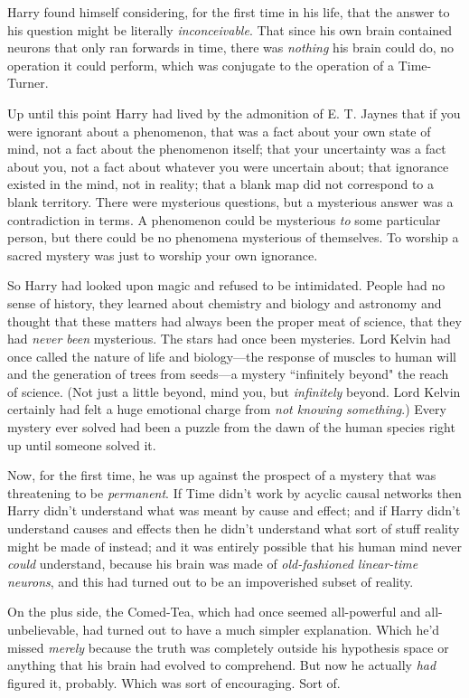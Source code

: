 Harry found himself considering, for the first time in his life, that the answer to his question might be literally \emph{inconceivable}. That since his own brain contained neurons that only ran forwards in time, there was \emph{nothing} his brain could do, no operation it could perform, which was conjugate to the operation of a Time-Turner.

Up until this point Harry had lived by the admonition of E. T. Jaynes that if you were ignorant about a phenomenon, that was a fact about your own state of mind, not a fact about the phenomenon itself; that your uncertainty was a fact about you, not a fact about whatever you were uncertain about; that ignorance existed in the mind, not in reality; that a blank map did not correspond to a blank territory. There were mysterious questions, but a mysterious answer was a contradiction in terms. A phenomenon could be mysterious \emph{to} some particular person, but there could be no phenomena mysterious of themselves. To worship a sacred mystery was just to worship your own ignorance.

So Harry had looked upon magic and refused to be intimidated. People had no sense of history, they learned about chemistry and biology and astronomy and thought that these matters had always been the proper meat of science, that they had \emph{never been} mysterious. The stars had once been mysteries. Lord Kelvin had once called the nature of life and biology—the response of muscles to human will and the generation of trees from seeds—a mystery ``infinitely beyond" the reach of science. (Not just a little beyond, mind you, but \emph{infinitely} beyond. Lord Kelvin certainly had felt a huge emotional charge from \emph{not knowing something}.) Every mystery ever solved had been a puzzle from the dawn of the human species right up until someone solved it.

Now, for the first time, he was up against the prospect of a mystery that was threatening to be \emph{permanent}. If Time didn't work by acyclic causal networks then Harry didn't understand what was meant by cause and effect; and if Harry didn't understand causes and effects then he didn't understand what sort of stuff reality might be made of instead; and it was entirely possible that his human mind never \emph{could} understand, because his brain was made of \emph{old-fashioned linear-time neurons}, and this had turned out to be an impoverished subset of reality.

On the plus side, the Comed-Tea, which had once seemed all-powerful and all-unbelievable, had turned out to have a much simpler explanation. Which he'd missed \emph{merely} because the truth was completely outside his hypothesis space or anything that his brain had evolved to comprehend. But now he actually \emph{had} figured it, probably. Which was sort of encouraging. Sort of.

